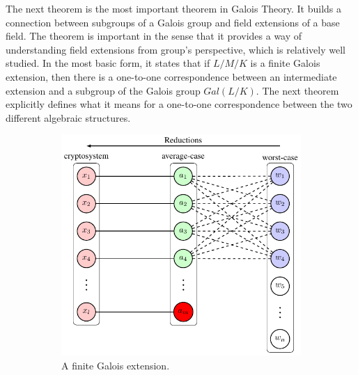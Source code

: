 \documentclass[../main.tex]{subfiles}
\begin{document}
The next theorem is the most important theorem in Galois Theory. It builds a connection between subgroups of a Galois group and field extensions of a base field. The theorem is important in the sense that it provides a way of understanding field extensions from group's perspective, which is relatively well studied. In the most basic form, it states that if $L/M/K$ is a finite Galois extension, then there is a one-to-one correspondence between an intermediate extension and a subgroup of the Galois group $Gal(L/K)$. The next theorem explicitly defines what it means for a one-to-one correspondence between the two different algebraic structures. 

\begin{figure}[ht]
	\centering
	\begin{subfigure}[t]{0.45\textwidth}
		\centering
		\includegraphics[page=10]{images/Lattice_crypto_tikz_folder.pdf}
		\caption{A finite Galois extension.}
		\label{subfig:finite galois ext}
	\end{subfigure}
	\begin{subfigure}[t]{0.45\textwidth}
		\centering

\end{subfigure}
\end{figure}
\end{document}
